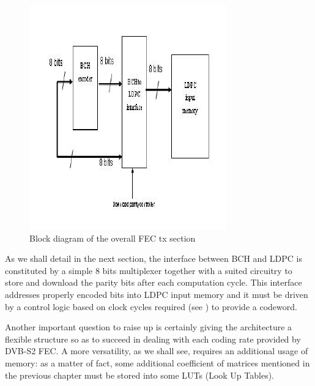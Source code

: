 \begin{figure} \centering
\includegraphics[width = 0.8\linewidth, height= 0.35\textheight]{FECARCH}
\caption{Block diagram of the overall FEC tx section} \label{fig:ovrsys}
\end{figure}

As we shall detail in the next section, the interface between BCH and LDPC is constituted by a simple 8 bits multiplexer together with a suited circuitry to store and download the parity bits after each computation cycle. This interface addresses properly encoded bits into LDPC input memory and it must be driven by a control logic based on clock cycles required (see ) to provide a codeword.

Another important question to raise up is certainly giving the architecture a flexible structure so as to succeed in dealing with each coding rate provided by DVB-S2 FEC. A more versatility, as we shall see, requires an additional usage of memory: as a matter of fact, some additional coefficient of matrices mentioned in the previous chapter must be stored into some LUTs (Look Up Tables).

